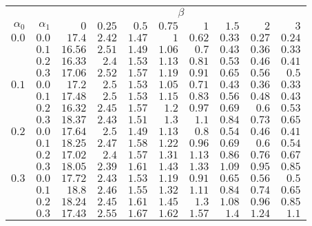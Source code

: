 \begin{tabular}{rr|rrrrrrrr}
\hline\hline
 && \multicolumn{8}{c}{$\beta$}\\
 $\alpha_0$ & $\alpha_1$ & $0$ & $0.25$ & $0.5$ & $0.75$ & $1$ & $1.5$ & $2$ & $3$ \\ 
 \hline
$0.0$ & $0.0$ & $17.4$ & $2.42$ & $1.47$ & $1$ & $0.62$ & $0.33$ & $0.27$ & $0.24$\\ 
 & $0.1$ & $16.56$ & $2.51$ & $1.49$ & $1.06$ & $0.7$ & $0.43$ & $0.36$ & $0.33$\\ 
 & $0.2$ & $16.33$ & $2.4$ & $1.53$ & $1.13$ & $0.81$ & $0.53$ & $0.46$ & $0.41$\\ 
 & $0.3$ & $17.06$ & $2.52$ & $1.57$ & $1.19$ & $0.91$ & $0.65$ & $0.56$ & $0.5$\\ 
\hline 
 $0.1$ & $0.0$ & $17.2$ & $2.5$ & $1.53$ & $1.05$ & $0.71$ & $0.43$ & $0.36$ & $0.33$\\ 
 & $0.1$ & $17.48$ & $2.5$ & $1.53$ & $1.15$ & $0.83$ & $0.56$ & $0.48$ & $0.43$\\ 
 & $0.2$ & $16.32$ & $2.45$ & $1.57$ & $1.2$ & $0.97$ & $0.69$ & $0.6$ & $0.53$\\ 
 & $0.3$ & $18.37$ & $2.43$ & $1.51$ & $1.3$ & $1.1$ & $0.84$ & $0.73$ & $0.65$\\ 
\hline 
 $0.2$ & $0.0$ & $17.64$ & $2.5$ & $1.49$ & $1.13$ & $0.8$ & $0.54$ & $0.46$ & $0.41$\\ 
 & $0.1$ & $18.25$ & $2.47$ & $1.58$ & $1.22$ & $0.96$ & $0.69$ & $0.6$ & $0.54$\\ 
 & $0.2$ & $17.02$ & $2.4$ & $1.57$ & $1.31$ & $1.13$ & $0.86$ & $0.76$ & $0.67$\\ 
 & $0.3$ & $18.05$ & $2.39$ & $1.61$ & $1.43$ & $1.33$ & $1.09$ & $0.95$ & $0.85$\\ 
\hline 
 $0.3$ & $0.0$ & $17.72$ & $2.43$ & $1.53$ & $1.19$ & $0.91$ & $0.65$ & $0.56$ & $0.5$\\ 
 & $0.1$ & $18.8$ & $2.46$ & $1.55$ & $1.32$ & $1.11$ & $0.84$ & $0.74$ & $0.65$\\ 
 & $0.2$ & $18.24$ & $2.45$ & $1.61$ & $1.45$ & $1.3$ & $1.08$ & $0.96$ & $0.85$\\ 
 & $0.3$ & $17.43$ & $2.55$ & $1.67$ & $1.62$ & $1.57$ & $1.4$ & $1.24$ & $1.1$\\ 
 \hline 
 \end{tabular}